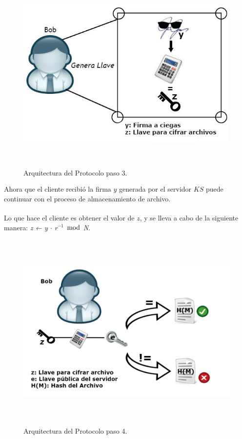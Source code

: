 \begin{figure}[H]
\centering
\includegraphics[width=16cm, height=10cm]{./images/Paso03.jpg}
\caption{Arquitectura del Protocolo paso 3.}
\end{figure}

Ahora que el cliente recibió la firma $y$ generada por el servidor $KS$ puede continuar con el proceso de almacenamiento de archivo. \\ \\
Lo que hace el cliente es obtener el valor de $z$, y se lleva a cabo de la siguiente manera: \hspace{2cm} \textit{z ← y $\cdot$ r$^{-1}$ $\bmod$ N}.  




\begin{figure}[H]
\centering
\includegraphics[width=16cm, height=10cm]{./images/Paso3_5.jpg}
\caption{Arquitectura del Protocolo paso 4.}

\end{figure}

